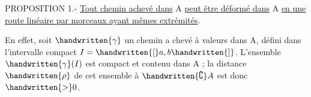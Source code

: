 PROPOSITION 1.- \uline{Tout chemin achevé dans} A \uline{peut être déformé dans} A \uline{en une route linéaire par morceaux ayant mêmes extrémités}.

En effet, soit $\handwritten{\gamma}$ un chemin a chevé à valeurs dans A, défini dans l'intervalle compact $I=\handwritten{[}a,b\handwritten{]}$. L'ensemble $\handwritten{\gamma}(I)$ est compact et contenu dans A ; la distance $\handwritten{\rho}$ de cet ensemble à $\handwritten{\complement}A$ est donc $\handwritten{>}0$.
